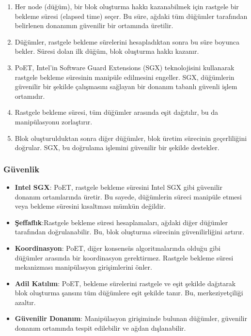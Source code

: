 \begin{enumerate}
    \item Her node (düğüm), bir blok oluşturma hakkı kazanabilmek için rastgele bir bekleme süresi (elapsed time) seçer. Bu süre, ağdaki tüm düğümler tarafından belirlenen donanımın güvenilir bir ortamında üretilir.
    \item Düğümler, rastgele bekleme sürelerini hesapladıktan sonra bu süre boyunca bekler. Süresi dolan ilk düğüm, blok oluşturma hakkı kazanır.
    \item PoET, Intel'in Software Guard Extensions (SGX) teknolojisini kullanarak rastgele bekleme süresinin manipüle edilmesini engeller. SGX, düğümlerin güvenilir bir şekilde çalışmasını sağlayan bir donanım tabanlı güvenli işlem ortamıdır.
    \item Rastgele bekleme süresi, tüm düğümler arasında eşit dağıtılır, bu da manipülasyonu zorlaştırır.
    \item Blok oluşturulduktan sonra diğer düğümler, blok üretim sürecinin geçerliliğini doğrular. SGX, bu doğrulama işlemini güvenilir bir şekilde destekler.
\end{enumerate}

\subsubsection{Güvenlik}

\begin{itemize}
    \item \textbf{Intel SGX}: PoET, rastgele bekleme süresini Intel SGX gibi güvenilir donanım ortamlarında üretir. Bu sayede, düğümlerin süreci manipüle etmesi veya bekleme süresini kısaltması mümkün değildir.
    \item \textbf{Şeffaflık}:Rastgele bekleme süresi hesaplamaları, ağdaki diğer düğümler tarafından doğrulanabilir. Bu, blok oluşturma sürecinin güvenilirliğini artırır.
    \item \textbf{Koordinasyon}: PoET, diğer konsensüs algoritmalarında olduğu gibi düğümler arasında bir koordinasyon gerektirmez. Rastgele bekleme süresi mekanizması manipülasyon girişimlerini önler.
    \item \textbf{Adil Katılım}: PoET, bekleme sürelerini rastgele ve eşit şekilde dağıtarak blok oluşturma şansını tüm düğümlere eşit şekilde tanır. Bu, merkeziyetçiliği azaltır.
    \item \textbf{Güvenilir Donanım}: Manipülasyon girişiminde bulunan düğümler, güvenilir donanım ortamında tespit edilebilir ve ağdan dışlanabilir.
\end{itemize}

